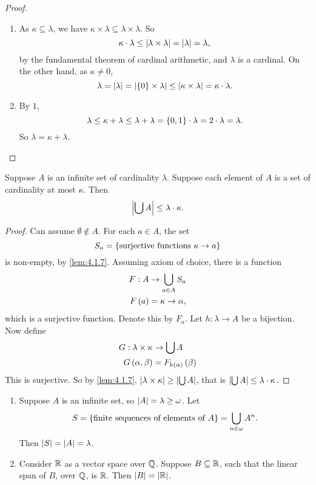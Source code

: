 \begin{proof}
\hfill
\begin{enumerate}
\item As $ \kappa \subseteq \lambda $, we have $ \kappa \times \lambda \subseteq \lambda \times \lambda $. So
$$ \kappa \cdot \lambda \le \left\lvert \lambda \times \lambda \right\rvert = \left\lvert \lambda \right\rvert = \lambda, $$
by the fundamental theorem of cardinal arithmetic, and $ \lambda $ is a cardinal. On the other hand, as $ \kappa \ne 0 $,
$$ \lambda = \left\lvert \lambda \right\rvert = \left\lvert \left\{ 0 \right\} \times \lambda \right\rvert \le \left\lvert \kappa \times \lambda \right\rvert = \kappa \cdot \lambda. $$
\item By $ 1 $,
$$ \lambda \le \kappa + \lambda \le \lambda + \lambda = \left\{ 0, 1 \right\} \cdot \lambda = 2 \cdot \lambda = \lambda. $$
So $ \lambda = \kappa + \lambda $.
\end{enumerate}
\end{proof}

\pagebreak

\begin{theorem}
\label{thm:4.2.6}
Suppose $ A $ is an infinite set of cardinality $ \lambda $. Suppose each element of $ A $ is a set of cardinality at most $ \kappa $. Then
$$ \left\lvert \bigcup A \right\rvert \le \lambda \cdot \kappa. $$
\end{theorem}

\begin{proof}
Can assume $ \emptyset \notin A $. For each $ a \in A $, the set
$$ S_a = \left\{ \text{surjective functions} \ \kappa \to a \right\} $$
is non-empty, by \ref{lem:4.1.7}. Assuming axiom of choice, there is a function
\begin{align*}
F : A & \to \bigcup_{a \in A} S_a \\
F\left( a \right) & = \kappa \to \alpha,
\end{align*}
which is a surjective function. Denote this by $ F_a $. Let $ h : \lambda \to A $ be a bijection. Now define
\begin{align*}
G : \lambda \times \kappa & \to \bigcup A \\
G\left( \alpha, \beta \right) & = F_{h\left( \alpha \right)}\left( \beta \right)
\end{align*}
This is surjective. So by \ref{lem:4.1.7}, $ \left\lvert \lambda \times \kappa \right\rvert \ge \left\lvert \bigcup A \right\rvert $, that is $ \left\lvert \bigcup A \right\rvert \le \lambda \cdot \kappa $.
\end{proof}

\begin{example1}
\hfill
\begin{enumerate}
\item Suppose $ A $ is an infinite set, so $ \left\lvert A \right\rvert = \lambda \ge \omega $. Let
$$ S = \left\{ \text{finite sequences of elements of} \ A \right\} = \bigcup_{n \in \omega} A^n. $$
Then $ \left\lvert S \right\rvert = \left\lvert A \right\rvert = \lambda $.
\item Consider $ \mathbb{R} $ as a vector space over $ \mathbb{Q} $. Suppose $ B \subseteq \mathbb{R} $, such that the linear span of $ B $, over $ \mathbb{Q} $, is $ \mathbb{R} $. Then $ \left\lvert B \right\rvert = \left\lvert \mathbb{R} \right\rvert $.
\end{enumerate}
\end{example1}

